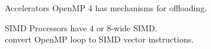 
\begin{numberedframe}{Accelerators}
  OpenMP 4 has mechanisms for offloading.
\end{numberedframe}

\begin{numberedframe}{SIMD}
  Processors have 4 or 8-wide SIMD.\\
  convert OpenMP loop to SIMD vector instructions.
\end{numberedframe}

\endinput

\begin{numberedframe}{}
  \begin{itemize}
  \item 
  \end{itemize}
\end{numberedframe}

